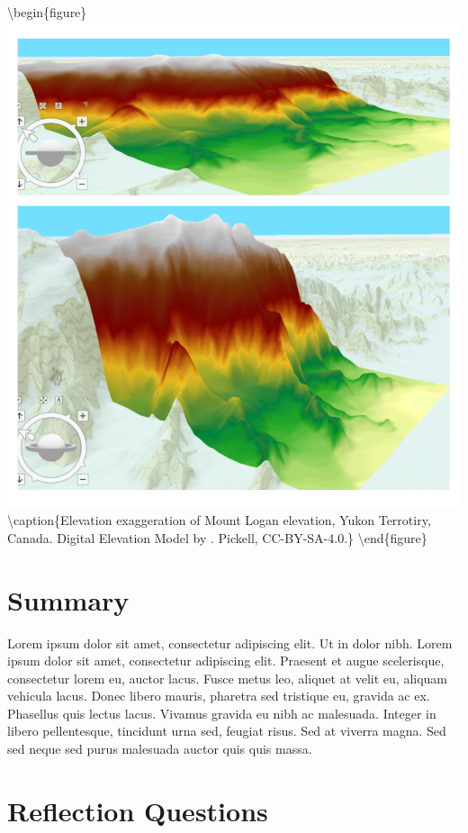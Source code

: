 \documentclass[
]{book}
\begin{document}
\textbackslash begin\{figure\}
\includegraphics[width=0.75\linewidth]{images/09-mount-logan-exaggeration} \textbackslash caption\{Elevation exaggeration of Mount Logan elevation, Yukon Terrotiry, Canada. Digital Elevation Model by \citet{natural_resources_canada_canadian_2015}. Pickell, CC-BY-SA-4.0.\}\label{fig:9-mount-logan-exaggeration}
\textbackslash end\{figure\}

\hypertarget{summary-8}{%
\section{Summary}\label{summary-8}}

Lorem ipsum dolor sit amet, consectetur adipiscing elit. Ut in dolor nibh. Lorem ipsum dolor sit amet, consectetur adipiscing elit. Praesent et augue scelerisque, consectetur lorem eu, auctor lacus. Fusce metus leo, aliquet at velit eu, aliquam vehicula lacus. Donec libero mauris, pharetra sed tristique eu, gravida ac ex. Phasellus quis lectus lacus. Vivamus gravida eu nibh ac malesuada. Integer in libero pellentesque, tincidunt urna sed, feugiat risus. Sed at viverra magna. Sed sed neque sed purus malesuada auctor quis quis massa.

\hypertarget{reflection-questions-6}{%
\section*{Reflection Questions}\label{reflection-questions-6}}
\end{document}
